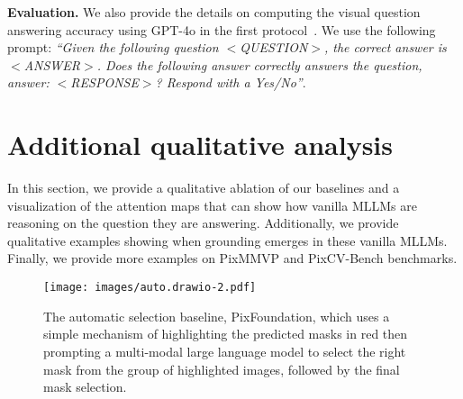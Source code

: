 \begin{table}[t]
\caption{Hugging Face model checkpoints used in our benchmarks.}
\label{tab:checkpoints}
\end{table}

\textbf{Evaluation.} We also provide the details on computing the visual question answering accuracy using GPT-4o in the first protocol~\cite{tong2024eyes}. We use the following prompt: \textit{``Given the following question $<$QUESTION$>$, the correct answer is $<$ANSWER$>$. Does the following answer correctly answers the question, answer: $<$RESPONSE$>$? Respond with a Yes/No''}.

\section{Additional qualitative analysis}
\label{app:qual}
In this section, we provide a qualitative ablation of our baselines and a visualization of the attention maps that can show how vanilla MLLMs are reasoning on the question they are answering. Additionally, we provide qualitative examples showing when grounding emerges in these vanilla MLLMs. Finally, we provide more examples on PixMMVP and PixCV-Bench benchmarks.

\begin{figure*}[t]
\centering
\texttt{[image: images/auto.drawio-2.pdf]}
\caption{The automatic selection baseline, PixFoundation, which uses a simple mechanism of highlighting the predicted masks in red then prompting a multi-modal large language model to select the right mask from the group of highlighted images, followed by the final mask selection.}
\label{fig:auto}
\end{figure*}

